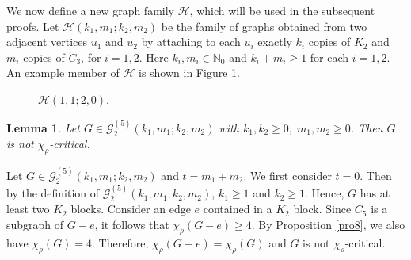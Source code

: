 \documentclass[12pt]{article}
\newtheorem{lemma}[theorem]{Lemma}
\newcommand{\proof}{\noindent{\bf Proof.\ }}
\begin{document}
We now define a new graph family $\mathcal{H}$, which will be used in the subsequent proofs.
Let $\mathcal{H}(k_1, m_1; k_2, m_2)$ be the family of graphs obtained from two adjacent vertices $u_1$ and $u_2$ by attaching to each $u_i$ exactly $k_i$ copies of $K_2$ and $m_i$ copies of $C_3$, for $i=1,2$.
Here \( k_i, m_i \in \mathbb{N}_0 \) and \( k_i + m_i \ge 1 \) for each $i=1,2$. An example member of $\mathcal{H}$ is shown in Figure \ref{fig7}.

\begin{figure}[H]
\centering
{}
\caption{$\mathcal{H}(1, 1; 2, 0)$.}
\label{fig7}
\end{figure}

\begin{lemma}\label{pro9}
Let $G \in \mathcal{G}_{2}^{(5)}(k_{1},m_{1};k_{2},m_{2})$ with $k_1, k_2 \geq 0, \; m_1, m_2 \geq 0$. Then $G$ is not $\chi_{\rho}$-critical.
\end{lemma}

\proof
Let $G \in \mathcal{G}_{2}^{(5)}(k_{1},m_{1};k_{2},m_{2})$ and $t = m_1+m_2$. We first consider $t =0$. Then by the definition of $\mathcal{G}_{2}^{(5)}(k_{1},m_{1};k_{2},m_{2})$, $k_1 \geq 1$ and $k_2 \geq 1$. Hence, $G$ has at least two $K_2$ blocks. Consider an edge $e$ contained in a $K_2$ block. Since $C_5$ is a subgraph of $G-e$, it follows that $\chi_{\rho}(G-e) \geq 4$. By Proposition \ref{pro8}, we also have $\chi_{\rho}(G)=4$. Therefore, $\chi_\rho(G-e)=\chi_\rho(G)$ and $G$ is not $\chi_\rho$-critical.
	
\end{document}

